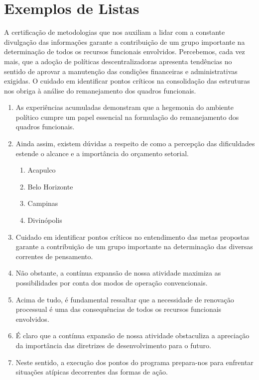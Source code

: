 \documentclass[fleqn]{profmat-cefet}
\begin{document}
\section{Exemplos de Listas}
\label{sec:exemplos_listas}

A certificação de metodologias que nos auxiliam a lidar com a constante
divulgação das informações garante a contribuição de um grupo importante na
determinação de todos os recursos funcionais envolvidos. Percebemos, cada vez
mais, que a adoção de políticas descentralizadoras apresenta tendências no
sentido de aprovar a manutenção das condições financeiras e administrativas
exigidas. O cuidado em identificar pontos críticos na consolidação das
estruturas nos obriga à análise do remanejamento dos quadros funcionais. 

\begin{enumerate}
    
    \item As experiências acumuladas demonstram que a hegemonia do ambiente político
    cumpre um papel essencial na formulação do remanejamento dos quadros funcionais.
    
    \item Ainda assim, existem dúvidas a respeito de como a percepção das
    dificuldades estende o alcance e a importância do orçamento setorial.
    \begin{enumerate}
        \item Acapulco
        \item Belo Horizonte
        \item Campinas
        \item Divinópolis
    \end{enumerate}
    
    \item Cuidado em identificar pontos críticos no entendimento das metas
    propostas garante a contribuição de um grupo importante na determinação das
    diversas correntes de pensamento.
    
    \item Não obstante, a contínua expansão de nossa atividade maximiza as
    possibilidades por conta dos modos de operação convencionais.
    
    \item Acima de tudo, é fundamental ressaltar que a necessidade de renovação
    processual é uma das consequências de todos os recursos funcionais envolvidos.
    
    \item É claro que a contínua expansão de nossa atividade obstaculiza a apreciação
    da importância das diretrizes de desenvolvimento para o futuro.
    
    \item Neste sentido, a execução dos pontos do programa prepara-nos para enfrentar
    situações atípicas decorrentes das formas de ação. 
    
\end{enumerate}
\end{document}

